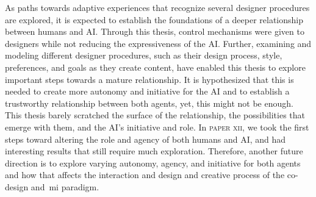 As paths towards adaptive experiences that recognize several designer procedures are explored, it is expected to establish the foundations of a deeper relationship between humans and AI. Through this thesis, control mechanisms were given to designers while not reducing the expressiveness of the AI. Further, examining and modeling different designer procedures, such as their design process, style, preferences, and goals as they create content, have enabled this thesis to explore important steps towards a mature relationship. It is hypothesized that this is needed to create more autonomy and initiative for the AI and to establish a trustworthy relationship between both agents, yet, this might not be enough. This thesis barely scratched the surface of the relationship, the possibilities that emerge with them, and the AI's initiative and role. In \textsc{paper xii}, we took the first steps toward altering the role and agency of both humans and AI, and had interesting results that still require much exploration. Therefore, another future direction is to explore varying autonomy, agency, and initiative for both agents and how that affects the interaction and design and creative process of the co-design and~\acrshort{mi} paradigm.









